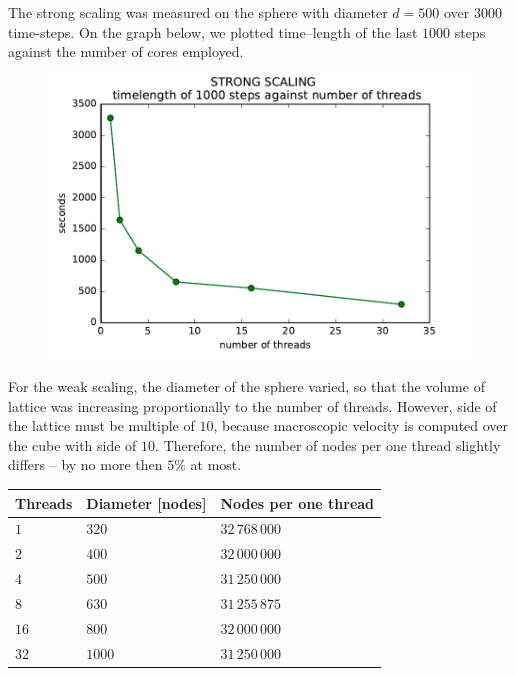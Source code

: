 The strong scaling was measured on the sphere with diameter $d = 500$ over $3000$ time-steps.
On the graph below, we plotted time--length of the last $1000$ steps against the number of cores employed.
\begin{figure}[H]
 \centering 
 \includegraphics[width=1\textwidth]{./img/strongscalingg}
\end{figure}

For the weak scaling, the diameter of the sphere varied, so that the volume of lattice was increasing proportionally to the number of threads. However, side of the lattice must be multiple of $10$, because macroscopic velocity is computed over the cube with side of $10$. Therefore, the number of nodes per one thread slightly differs -- by no more then $5\%$ at most.

\begin{tabular}{ |p{2cm}|p{4cm}|p{4cm}| }
 \hline
 Threads & Diameter [nodes] & Nodes per one thread \\
 \hline
 \hline
$1$ & $320$ & $32\,768\,000$ \\
 \hline
$2$ & $400$ & $32\,000\,000$\\
 \hline
$4$ & $500$ & $31\,250\,000$ \\
 \hline
$8$ & $630$ & $31\,255\,875$\\
 \hline
$16$ & $800$ & $32\,000\,000$ \\
 \hline
$32$ & $1000$ & $31\,250\,000$ \\
 \hline
 \end{tabular}


